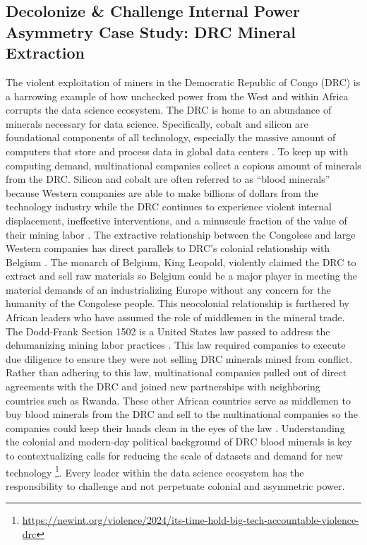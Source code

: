 \subsection{Decolonize \& Challenge Internal Power Asymmetry Case Study: DRC Mineral Extraction}
The violent exploitation of miners in the Democratic Republic of Congo (DRC) is a harrowing example of how unchecked power from the West and within Africa corrupts the data science ecosystem. The DRC is home to an abundance of minerals necessary for data science. Specifically, cobalt and silicon are foundational components of all technology, especially the massive amount of computers that store and process data in global data centers \cite{ndjungu2020blood}. To keep up with computing demand, multinational companies collect a copious amount of minerals from the DRC. Silicon and cobalt are often referred to as ``blood minerals'' because Western companies are able to make billions of dollars from the technology industry while the DRC continues to experience violent internal displacement, ineffective interventions, and a minuscule fraction of the value of their mining labor \cite{ndjungu2020blood}. The extractive relationship between the Congolese and large Western companies has direct parallels to DRC's colonial relationship with Belgium \cite{ndjungu2020blood}. 
The monarch of Belgium, King Leopold, violently claimed the DRC to extract and sell raw materials so Belgium could be a major player in meeting the material demands of an industrializing Europe without any concern for the humanity of the Congolese people. This neocolonial relationship is furthered by African leaders who have assumed the role of middlemen in the mineral trade. The Dodd-Frank Section 1502 is a United States law passed to address the dehumanizing mining labor practices \cite{ndjungu2020blood}. This law required companies to execute due diligence to ensure they were not selling DRC minerals mined from conflict. Rather than adhering to this law, multinational companies pulled out of direct agreements with the DRC and joined new partnerships with neighboring countries such as Rwanda. These other African countries serve as middlemen to buy blood minerals from the DRC and sell to the multinational companies so the companies could keep their hands clean in the eyes of the law \cite{ndjungu2020blood}. Understanding the colonial and modern-day political background of DRC blood minerals is key to contextualizing calls for reducing the scale of datasets and demand for new technology \footnote{\url{https://newint.org/violence/2024/its-time-hold-big-tech-accountable-violence-drc}}. Every leader within the data science ecosystem has the responsibility to challenge and not perpetuate colonial and asymmetric power. 

